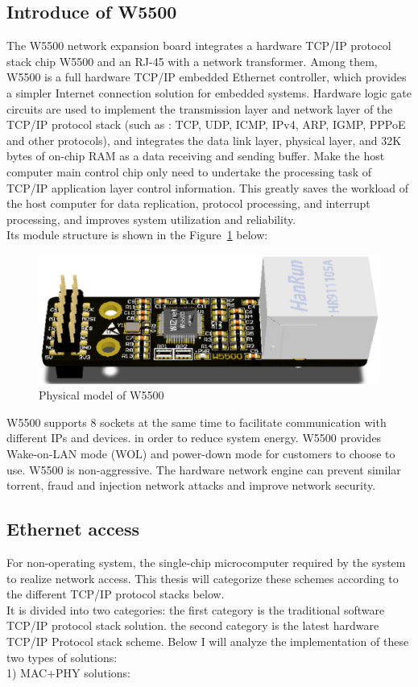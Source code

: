\subsection{Introduce of W5500}
\label{sec:Introduce of W5500}
The W5500 network expansion board integrates a hardware TCP/IP protocol stack chip W5500 and an RJ-45 with a network transformer. Among them, W5500 is a full hardware TCP/IP embedded Ethernet controller, which provides a simpler Internet connection solution for embedded systems. Hardware logic gate circuits are used to implement the transmission layer and network layer of the TCP/IP protocol stack (such as : TCP, UDP, ICMP, IPv4, ARP, IGMP, PPPoE and other protocols), and integrates the data link layer, physical layer, and 32K bytes of on-chip RAM as a data receiving and sending buffer. Make the host computer main control chip only need to undertake the processing task of TCP/IP application layer control information. This greatly saves the workload of the host computer for data replication, protocol processing, and interrupt processing, and improves system utilization and reliability. 
\\
Its module structure is shown in the Figure~\ref{fig:2.6} below:
\\
\begin{figure}[h]
	\centering
	\includegraphics[width=15cm] {grafiken/2.6.eps}
	\caption{Physical model of W5500} 
	\label{fig:2.6}
\end{figure}
W5500 supports 8 sockets at the same time to facilitate communication with different IPs and devices. in order to reduce system energy. W5500 provides Wake-on-LAN mode (WOL) and power-down mode for customers to choose to use. W5500 is non-aggressive. The hardware network engine can prevent similar torrent, fraud and injection network attacks and improve network security.

\subsection{Ethernet access}
\label{sec:Ethernet access}
For non-operating system, the single-chip microcomputer required by the system to realize network access. This thesis will categorize these schemes according to the different TCP/IP protocol stacks below.
\\
It is divided into two categories: the first category is the traditional software TCP/IP protocol stack solution. the second category is the latest hardware TCP/IP
Protocol stack scheme. Below I will analyze the implementation of these two types of solutions: 
\\
1) MAC+PHY solutions:

